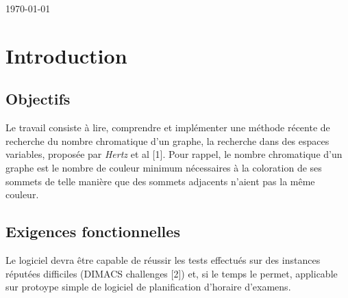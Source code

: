 \documentclass[runningheads]{llncs}
\begin{document}
\maketitle              %

\begin{center} \today \end{center}
\begin{abstract}
Ce rapport est rendu dans le cadre du cours de ``Gestion de Projets Logiciels" (dispens\'e par Monsieur \emph{Tom Mens} en ann\'ee 
acad\'emique 2010-2011). Le but de ce rapport est d’énoncer les ressources matérielles et humaines nécessaires ainsi que 
les contraintes de temps, de budget et de fonctionnalité du projet.

\end{abstract}

\section{Introduction}\label{sec:intro}

\subsection{Objectifs}

Le travail consiste à lire, comprendre et implémenter une méthode récente de recherche du nombre chromatique d'un graphe, la 
recherche dans des espaces variables, proposée par \textit{Hertz} et al [1]. Pour rappel, le nombre chromatique d'un graphe est le 
nombre de couleur minimum nécessaires à la coloration de ses sommets de telle manière que des sommets adjacents n'aient pas la 
même couleur.

\subsection{Exigences fonctionnelles}

Le logiciel devra être capable de réussir les tests effectués sur des instances réputées difficiles (DIMACS challenges [2]) et, 
si le temps le permet, applicable sur protoype simple de logiciel de planification d'horaire d'examens.

\end{document}
